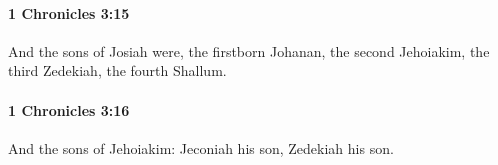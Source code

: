 		\paragraph{1 Chronicles 3:15} %
			\label{1CHRONICLES-3-15}

			And the sons of Josiah were, the firstborn Johanan, the second Jehoiakim, the third Zedekiah, the fourth Shallum.


		\paragraph{1 Chronicles 3:16} %
			\label{1CHRONICLES-3-16}

			And the sons of Jehoiakim: Jeconiah his son, Zedekiah his son.


